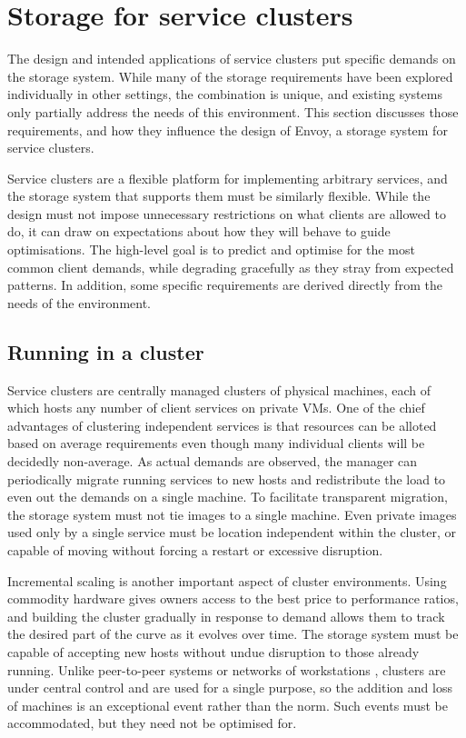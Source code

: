 \section{Storage for service clusters}

The design and intended applications of service clusters put specific demands on the storage system. While many of the storage requirements have been explored individually in other settings, the combination is unique, and existing systems only partially address the needs of this environment. This section discusses those requirements, and how they influence the design of Envoy, a storage system for service clusters.

Service clusters are a flexible platform for implementing arbitrary services, and the storage system that supports them must be similarly flexible. While the design must not impose unnecessary restrictions on what clients are allowed to do, it can draw on expectations about how they will behave to guide optimisations. The high-level goal is to predict and optimise for the most common client demands, while degrading gracefully as they stray from expected patterns. In addition, some specific requirements are derived directly from the needs of the environment.

\subsection{Running in a cluster}

Service clusters are centrally managed clusters of physical machines, each of which hosts any number of client services on private VMs. One of the chief advantages of clustering independent services is that resources can be alloted based on average requirements even though many individual clients will be decidedly non-average. As actual demands are observed, the manager can periodically migrate running services to new hosts and redistribute the load to even out the demands on a single machine. To facilitate transparent migration, the storage system must not tie images to a single machine. Even private images used only by a single service must be location independent within the cluster, or capable of moving without forcing a restart or excessive disruption.

Incremental scaling is another important aspect of cluster environments. Using commodity hardware gives owners access to the best price to performance ratios, and building the cluster gradually in response to demand allows them to track the desired part of the curve as it evolves over time. The storage system must be capable of accepting new hosts without undue disruption to those already running. Unlike peer-to-peer systems \cite{blake} or networks of workstations \cite{anderson95a}, clusters are under central control and are used for a single purpose, so the addition and loss of machines is an exceptional event rather than the norm. Such events must be accommodated, but they need not be optimised for.

